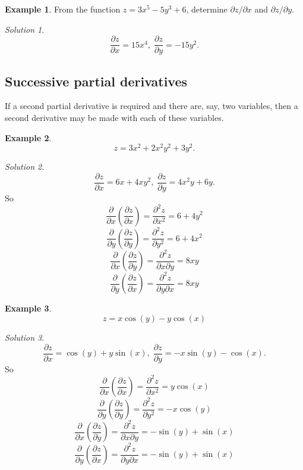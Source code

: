\documentclass[
  11pt,
  oneside]{book}
\newcommand{\slide}{}
\theoremstyle{definition}
\theoremstyle{definition}
\newtheorem{example}{Example}[chapter]
\theoremstyle{definition}
\theoremstyle{definition}
\theoremstyle{remark}
\newtheorem*{solution}{Solution}
\begin{document}
\slide

\begin{example}
From the function \(z=3x^5-5y^3+6\), determine \(\partial z/\partial x\) and \(\partial z/\partial y\).
\end{example}

\begin{solution}
\[
\frac{\partial z}{\partial x} = 15x^4,\;\frac{\partial z}{\partial y} = -15y^2.
\]
\end{solution}

\slide

\subsection{Successive partial derivatives}\label{successive-partial-derivatives}

If a second partial derivative is required and there are, say, two variables, then a second derivative may be made with each of these variables.

\begin{example}
\[
z=3x^2+2x^2y^2+3y^2.
\]
\end{example}

\begin{solution}
\[
\frac{\partial z}{\partial x} = 6x+4xy^2,\;\frac{\partial z}{\partial y} = 4x^2y+6y.
\]
So
\[
\frac{\partial}{\partial x}\left(\frac{\partial z}{\partial x}\right) = \frac{\partial^2 z}{\partial x^2} = 6+4y^2
\]
\[
\frac{\partial}{\partial y}\left(\frac{\partial z}{\partial y}\right) = \frac{\partial^2 z}{\partial y^2} = 6+4x^2
\]
\[
\frac{\partial}{\partial x}\left(\frac{\partial z}{\partial y}\right) = \frac{\partial^2 z}{\partial x\partial y} = 8xy
\]
\[
\frac{\partial}{\partial y}\left(\frac{\partial z}{\partial x}\right) = \frac{\partial^2 z}{\partial y\partial x} = 8xy
\]
\end{solution}

\slide

\begin{example}
\[
z = x\cos(y)-y\cos(x)
\]
\end{example}

\begin{solution}
\[
\frac{\partial z}{\partial x} = \cos(y)+y\sin(x),\;\frac{\partial z}{\partial y} = -x\sin(y)-\cos(x).
\]
So
\[
\frac{\partial}{\partial x}\left(\frac{\partial z}{\partial x}\right) = \frac{\partial^2 z}{\partial x^2} = y\cos(x)
\]
\[
\frac{\partial}{\partial y}\left(\frac{\partial z}{\partial y}\right) = \frac{\partial^2 z}{\partial y^2} = -x\cos(y)
\]
\[
\frac{\partial}{\partial x}\left(\frac{\partial z}{\partial y}\right) = \frac{\partial^2 z}{\partial x\partial y} = -\sin(y)+\sin(x)
\]
\[
\frac{\partial}{\partial y}\left(\frac{\partial z}{\partial x}\right) = \frac{\partial^2 z}{\partial y\partial x} = -\sin(y)+\sin(x)
\]
\end{solution}
\end{document}

